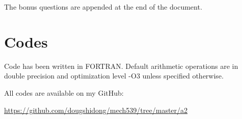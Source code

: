 \documentclass[letterpaper,12pt,]{article}
\begin{document}
The bonus questions are appended at the end of the document.

\section*{Codes}

Code has been written in FORTRAN. Default arithmetic operations are in double precision and optimization level -O3 unless specified otherwise.

All codes are available on my GitHub:

\url{https://github.com/dougshidong/mech539/tree/master/a2}


\end{document}
